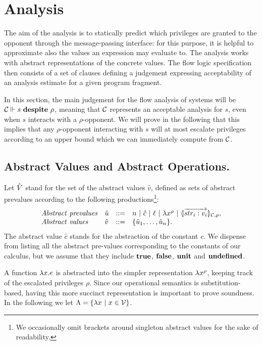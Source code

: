 \section{Analysis}
\label{sec:Analysis}
The aim of the analysis is to statically predict which privileges
are granted to the opponent through the message-passing interface:
for this purpose, it is helpful to approximate also the values an
expression may evaluate to. The analysis works with abstract
representations of the concrete values. The flow logic specification
then consists of a set of clauses defining a judgement expressing
acceptability of an analysis estimate for a given program fragment.

In this section, the main judgement for the flow analysis of systems
will be ${\cal C}\Vdash s \ \mathbf{despite}\ \rho$, meaning that ${\cal C}$ represents
an acceptable analysis for $s$, even when $s$ interacts with a $\rho$-opponent.
We will prove in the following that this implies that any $\rho$-opponent
interacting with $s$ will at most escalate privileges according to an
upper bound which we can immediately compute from ${\cal C}$.

\subsection{Abstract Values and Abstract Operations.} 
Let $\hat{V}$ stand for the set of the abstract values $\hat{v}$,
defined as sets of abstract prevalues according to the following 
productions\footnote{We occasionally omit brackets around singleton 
abstract values for the sake of readability.}:
\[
\begin{array}{llcl}
\mathit{Abstract\ prevalues} & \hat{u} & ::= & n ~|~ \hat{c} ~|~ \ell ~|~ \lambda x^{\rho} ~|~ \langle\!| \overrightarrow{str_i: v_i} |\!\rangle_{{\cal C},\rho}, \\
\mathit{Abstract\ values} & \hat{v} & ::= & \{\hat{u}_1,\ldots,\hat{u}_n\}.
\end{array}
\]
The abstract value $\hat{c}$ stands for the abstraction of the constant $c$.
We dispense from listing all the abstract pre-values corresponding to 
the constants of our calculus, but we assume that they include $\mathbf{true}$, 
$\mathbf{false}$, $\mathbf{unit}$ and $\mathbf{undefined}$.

A function $\lambda x.e$ is abstracted into the simpler representation
$\lambda x^{\rho}$, keeping track of the escalated privileges $\rho$. Since 
our operational semantics is substitution-based, having this more succinct
representation is important to prove soundness. In the following we let 
$\Lambda = \{\lambda x ~|~ x \in \mathcal{V}\}$.

